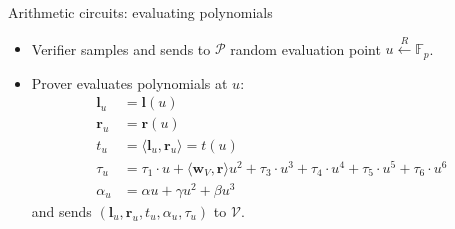 \documentclass{zkdl-presentation-template}
\begin{document}
\begin{frame}{Arithmetic circuits: evaluating polynomials}
    \begin{itemize}
        \item Verifier samples and sends to $\mathcal{P}$ random evaluation point $u \xleftarrow{R} \mathbb{F}_p$.
        \item Prover evaluates polynomials at $u$:
            \begin{equation*}
                \begin{aligned}
                    \mathbf{l}_u &= \mathbf{l}(u) \\
                    \mathbf{r}_u &= \mathbf{r}(u) \\
                    t_u &= \langle \mathbf{l}_u, \mathbf{r}_u \rangle = t(u) \\
                    \tau_u &= \tau_1 \cdot u + \langle \mathbf{w}_V, \mathbf{r} \rangle u^2 + \tau_3 \cdot u^3 + \tau_4 \cdot u^4 + \tau_5 \cdot u^5 + \tau_6 \cdot u^6\\
                    \alpha_u &= \alpha u + \gamma u^2 + \beta u^3
                \end{aligned}
            \end{equation*}
            and sends $(\mathbf{l}_u, \mathbf{r}_u, t_u, \alpha_u, \tau_u)$ to $\mathcal{V}$.
    \end{itemize}
\end{frame}
\end{document}

